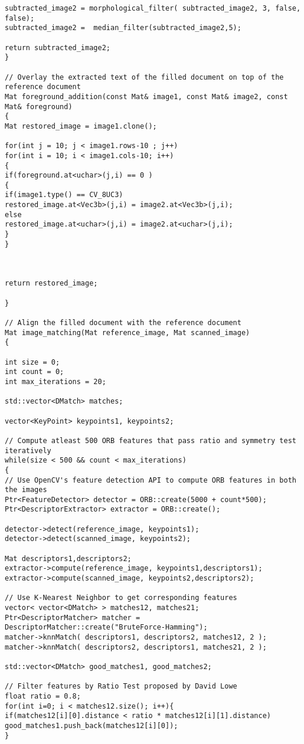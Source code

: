 \begin{lstlisting}
subtracted_image2 = morphological_filter( subtracted_image2, 3, false, false);
subtracted_image2 =  median_filter(subtracted_image2,5);

return subtracted_image2;
}

// Overlay the extracted text of the filled document on top of the reference document
Mat foreground_addition(const Mat& image1, const Mat& image2, const Mat& foreground)
{
Mat restored_image = image1.clone();

for(int j = 10; j < image1.rows-10 ; j++)
for(int i = 10; i < image1.cols-10; i++)
{
if(foreground.at<uchar>(j,i) == 0 )
{
if(image1.type() == CV_8UC3)
restored_image.at<Vec3b>(j,i) = image2.at<Vec3b>(j,i);
else
restored_image.at<uchar>(j,i) = image2.at<uchar>(j,i);
}
}



return restored_image;

}

// Align the filled document with the reference document
Mat image_matching(Mat reference_image, Mat scanned_image)
{

int size = 0;
int count = 0;
int max_iterations = 20;

std::vector<DMatch> matches;

vector<KeyPoint> keypoints1, keypoints2;

// Compute atleast 500 ORB features that pass ratio and symmetry test iteratively
while(size < 500 && count < max_iterations)
{
// Use OpenCV's feature detection API to compute ORB features in both the images
Ptr<FeatureDetector> detector = ORB::create(5000 + count*500);
Ptr<DescriptorExtractor> extractor = ORB::create();

detector->detect(reference_image, keypoints1);
detector->detect(scanned_image, keypoints2);

Mat descriptors1,descriptors2;
extractor->compute(reference_image, keypoints1,descriptors1);
extractor->compute(scanned_image, keypoints2,descriptors2);

// Use K-Nearest Neighbor to get corresponding features
vector< vector<DMatch> > matches12, matches21;
Ptr<DescriptorMatcher> matcher = DescriptorMatcher::create("BruteForce-Hamming");
matcher->knnMatch( descriptors1, descriptors2, matches12, 2 );
matcher->knnMatch( descriptors2, descriptors1, matches21, 2 );

std::vector<DMatch> good_matches1, good_matches2;

// Filter features by Ratio Test proposed by David Lowe 
float ratio = 0.8;
for(int i=0; i < matches12.size(); i++){
if(matches12[i][0].distance < ratio * matches12[i][1].distance)
good_matches1.push_back(matches12[i][0]);
}


\end{lstlisting}
